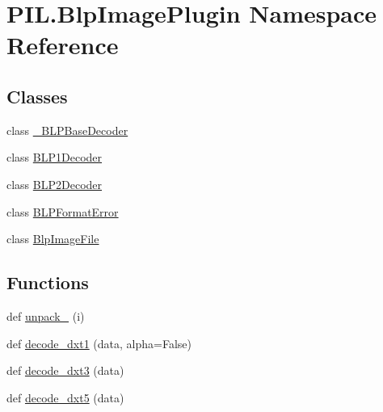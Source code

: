 \hypertarget{namespacePIL_1_1BlpImagePlugin}{}\section{P\+I\+L.\+Blp\+Image\+Plugin Namespace Reference}
\label{namespacePIL_1_1BlpImagePlugin}
\subsection*{Classes}
\begin{DoxyCompactItemize}
\item 
class \hyperlink{classPIL_1_1BlpImagePlugin_1_1__BLPBaseDecoder}{\+\_\+\+B\+L\+P\+Base\+Decoder}
\item 
class \hyperlink{classPIL_1_1BlpImagePlugin_1_1BLP1Decoder}{B\+L\+P1\+Decoder}
\item 
class \hyperlink{classPIL_1_1BlpImagePlugin_1_1BLP2Decoder}{B\+L\+P2\+Decoder}
\item 
class \hyperlink{classPIL_1_1BlpImagePlugin_1_1BLPFormatError}{B\+L\+P\+Format\+Error}
\item 
class \hyperlink{classPIL_1_1BlpImagePlugin_1_1BlpImageFile}{Blp\+Image\+File}
\end{DoxyCompactItemize}
\subsection*{Functions}
\begin{DoxyCompactItemize}
\item 
def \hyperlink{namespacePIL_1_1BlpImagePlugin_adb9e25ac3bbe03afb98fd41f3240aaea}{unpack\+\_} (i)
\item 
def \hyperlink{namespacePIL_1_1BlpImagePlugin_ab4aca494d15595dfa28f88cbcd78a721}{decode\+\_\+dxt1} (data, alpha=False)
\item 
def \hyperlink{namespacePIL_1_1BlpImagePlugin_a7fb2c338e574dc1747ca83c74b85a99b}{decode\+\_\+dxt3} (data)
\item 
def \hyperlink{namespacePIL_1_1BlpImagePlugin_ad2800c3c913889a70679466ec7491e7d}{decode\+\_\+dxt5} (data)
\end{DoxyCompactItemize}
